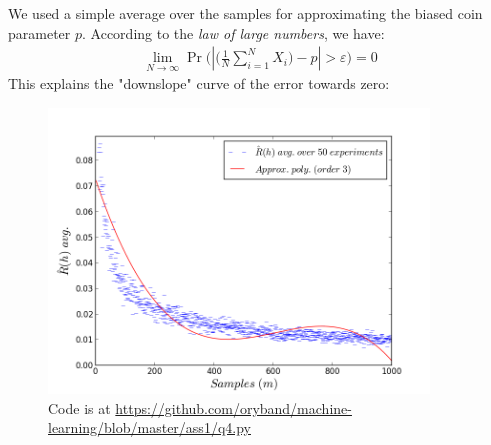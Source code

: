 \documentclass[a4paper]{article}
\renewcommand{\epsilon}{\varepsilon}
\newcommand{\Sum}{\sum\limits_{i=1}^N}
\newcommand{\qedsquare}{\tag*{$\square$}}
\begin{document}
We used a simple average over the samples for approximating the biased coin parameter $p$.
According to the \textit{law of large numbers}, we have:
\begin{align*}
    \displaystyle \lim_{N \to \infty} \Pr \Bigg( | \Big( \frac{1}{N} \Sum X_i \Big) - p | > \epsilon \Bigg) = 0
\end{align*}
This explains the "downslope" curve of the error towards zero:

\begin{figure}[h!]
    \includegraphics[width=0.9\textwidth]{q4.png}
    \caption{Code is at \url{https://github.com/oryband/machine-learning/blob/master/ass1/q4.py}}
\end{figure}

\begin{align*}\qedsquare\end{align*}
\end{document}
